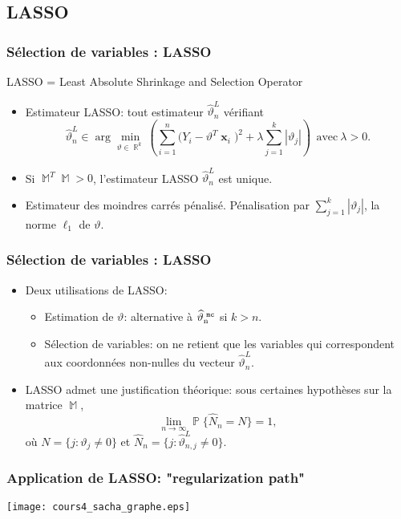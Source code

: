 \documentclass{beamer}
\DeclareMathOperator{\R}{{\mathbb R}}
\DeclareMathOperator{\PP}{{\mathbb P}}
\DeclareMathOperator{\bx}{\boldsymbol{x}}
\DeclareMathOperator{\estMC}{\widehat \vartheta_n^{\,\,{\tt mc}}}
\DeclareMathOperator{\design}{\mathbb{M}}
\begin{document}
\subsection{LASSO}

\begin{frame}
\frametitle{Sélection de variables : LASSO}

LASSO = Least Absolute Shrinkage and Selection Operator

\begin{itemize}
\item \alert{Estimateur LASSO}: tout estimateur $\widehat\vartheta^{L}_n$
vérifiant
$$\widehat\vartheta^{L}_n \in \arg \min_{\vartheta \in \R^k}\left(\sum_{i = 1}^n
\big(Y_i-\vartheta^T\bx_i\big)^2 + \lambda \sum_{j =
1}^k|\vartheta_j|\right) \ \ \text{avec} \ \lambda>0.
$$
\item Si $\design^T\design>0$, l'estimateur LASSO $\widehat\vartheta^{L}_n$ est unique.
\item Estimateur des moindres carrés \alert{pénalisé}.
Pénalisation par $\sum_{j = 1}^k|\vartheta_j|$, la norme $\ell_1$
de $\vartheta$.
\end{itemize}
\end{frame}

\begin{frame}
\frametitle{Sélection de variables : LASSO}
\begin{itemize}
\item Deux utilisations de
LASSO:
\begin{itemize}
\item \alert{Estimation de $\vartheta$}: alternative \`a
$\estMC$ si $k>n$.
\item \alert{Sélection de variables}: on ne retient que les
variables qui correspondent aux coordonnées non-nulles du vecteur
$\widehat\vartheta^{L}_n$.
\end{itemize}
\item LASSO admet une \alert{justification théorique}: sous certaines hypoth\`eses sur la
matrice $\design$,
$$
\lim_{n\to\infty} \PP\{ \widehat N_n = N \} =1,
$$
o\`u $N= \{j: \vartheta_{j}\ne 0\}$ et $\widehat N_n= \{j:
\widehat\vartheta^{L}_{n,j}\ne 0\}$.
\end{itemize}
\end{frame}

\begin{frame}
    \frametitle{Application de LASSO: "regularization path"}
\begin{center}
\vspace{-1cm}
\texttt{[image: cours4\_sacha\_graphe.eps]}\hspace{3cm}
\end{center}
\end{frame}
\end{document}
